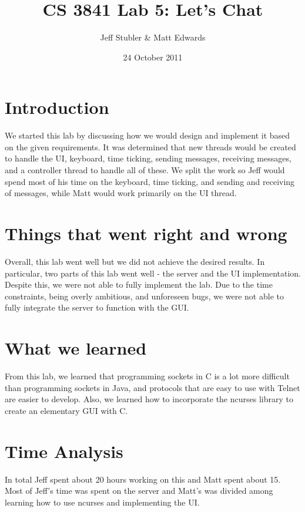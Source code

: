 \documentclass{article}
\begin{document}
\title{CS 3841 Lab 5: Let's Chat}
\author{Jeff Stubler & Matt Edwards}
\date{24 October 2011}
\maketitle

\section*{Introduction}
We started this lab by discussing how we would design and implement it based on the given requirements. It was determined that new threads would be created to handle the UI, keyboard, time ticking, sending messages, receiving messages, and a controller thread to handle all of these. We split the work so Jeff would spend most of his time on the keyboard, time ticking, and sending and receiving of messages, while Matt would work primarily on the UI thread.

\section*{Things that went right and wrong}
Overall, this lab went well but we did not achieve the desired results. In particular, two parts of this lab went well - the server and the UI implementation. Despite this, we were not able to fully implement the lab. Due to the time constraints, being overly ambitious, and unforeseen bugs, we were not able to fully integrate the server to function with the GUI.

\section*{What we learned}
From this lab, we learned that programming sockets in C is a lot more difficult than programming sockets in Java, and protocols that are easy to use with Telnet are easier to develop. Also, we learned how to incorporate the ncurses library to create an elementary GUI with C.

\section*{Time Analysis}
In total Jeff spent about 20 hours working on this and Matt spent about 15. Most of Jeff's time was spent on the server and Matt's was divided among learning how to use ncurses and implementing the UI.
\end{document}
